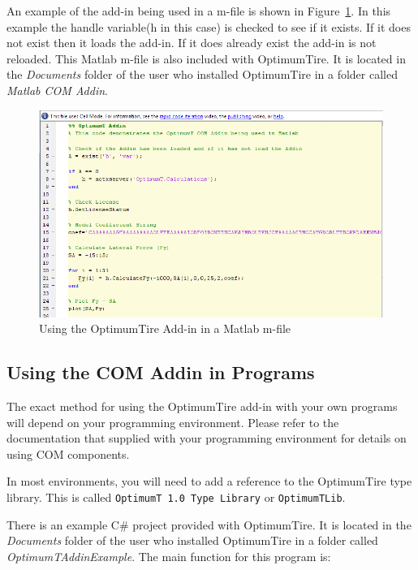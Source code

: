 An example of the add-in being used in a m-file is shown in Figure~\ref{fig:mfileAddin}. In this example the handle variable(h in this case) is checked to see if it exists. If it does not exist then it loads the add-in. If it does already exist the add-in is not reloaded. This Matlab m-file is also included with OptimumTire. It is located in the \textit{Documents} folder of the user who installed OptimumTire in a folder called \textit{Matlab COM Addin}.

\begin{figure}[H]
	\centering
		\includegraphics[width=1.0\textwidth]{mfileAddin.png}
	\caption{Using the OptimumTire Add-in in a Matlab m-file}
	\label{fig:mfileAddin}
\end{figure}

\subsection{Using the COM Addin in Programs}
\label{sec:OptimumTAddin:ComProgram}

The exact method for using the OptimumTire add-in with your own programs will depend on your programming environment. Please refer to the documentation that supplied with your programming environment for details on using COM components.

In most environments, you will need to add a reference to the OptimumTire type library. This is called \texttt{OptimumT 1.0 Type Library} or \texttt{OptimumTLib}.

There is an example C\# project provided with OptimumTire. It is located in the \textit{Documents} folder of the user who installed OptimumTire in a folder called \textit{OptimumTAddinExample}. The main function for this program is:


